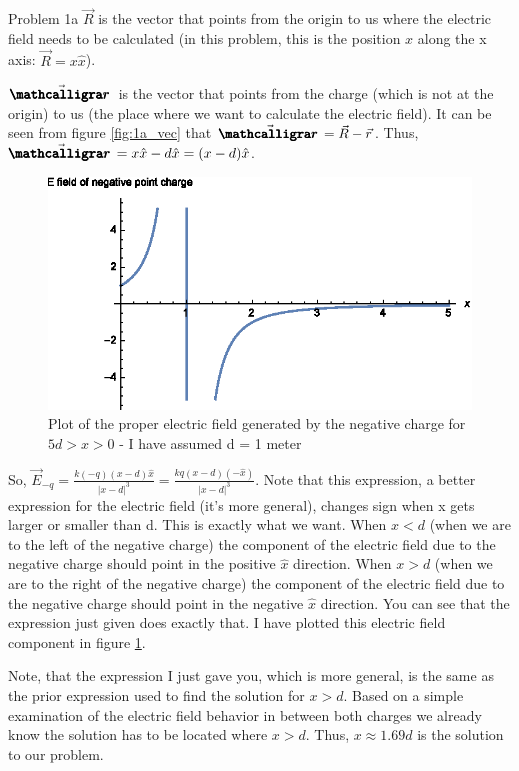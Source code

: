 \begin{homeworkProblem}
\begin{homeworkSection}{Problem 1a}
$\vec{R}$ is the vector that points from the origin to us where the electric field needs to be calculated (in this problem, this is the position $x$ along the x axis: $\vec{R} = x\hat{x}$).

$\vec{\pmb{\scriptr}}$ is the vector that points from the charge (which is not at the origin) to us (the place where we want to calculate the electric field). It can be seen from figure \ref{fig:1a_vec} that $\vec{\pmb{\scriptr}} = \vec{R}-\vec{r}$. Thus, $\vec{\pmb{\scriptr}} = x\hat{x}-d\hat{x} = (x-d)\hat{x}$.



\begin{figure}%
\centering
\includegraphics[width=.65\columnwidth]{1a_neg_plot.eps}%
\caption{Plot of the proper electric field generated by the negative charge for $5d>x>0$ - I have assumed d = 1 meter}%
\label{fig:1a_neg_plot}%
\end{figure}

So, $\vec{E}_{-q} = \frac{k (-q) (x-d)\hat{x}}{|x-d|^3} = \frac{k q (x-d)(-\hat{x})}{|x-d|^3} $. Note that this expression, a better expression for the electric field (it's more general), changes sign when x gets larger or smaller than d. This is exactly what we want. When $x < d$ (when we are to the left of the negative charge) the component of the electric field due to the negative charge should point in the positive $\hat{x}$ direction. When $x>d$ (when we are to the right of the negative charge) the component of the electric field due to the negative charge should point in the negative $\hat{x}$ direction. You can see that the expression just given does exactly that. I have plotted this electric field component in figure \ref{fig:1a_neg_plot}.

Note, that the expression I just gave you, which is more general, is the same as the prior expression used to find the solution for $x>d$. Based on a simple examination of the electric field behavior in between both charges we already know the solution has to be located where $x>d$. Thus, $ x \approx 1.69d$ is the solution to our problem.



\end{homeworkSection}
\end{homeworkProblem}
